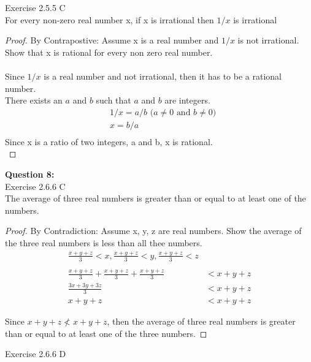 \documentclass[11pt]{article}
\begin{document}
\noindent Exercise 2.5.5 C\\

For every non-zero real number x, if x is irrational then $1/x$ is irrational\\
\begin{proof}
By Contrapostive: Assume x is a real number and $1/x$ is not irrational. Show that x is rational for every non zero real number. \\\\
Since $1/x$ is a real number and not irrational, then it has to be a rational number.\\
There exists an $a$ and $b$ such that $a$ and $b$ are integers.\\
\begin{align*}
&1/x = a/b \text{ ($a \not = 0$ and $b \not = 0$)}\\
&x = b/a\\
\end{align*}
Since x is a ratio of two integers, a and b, x is rational.\\ \qedhere
\end{proof}

\newpage
\noindent \textbf{Question 8:} \\


\noindent Exercise 2.6.6 C\\

\noindent The average of three real numbers is greater than or equal to at least one of the numbers.\\
\begin{proof}
By Contradiction: Assume x, y, z are real numbers. Show the average of the three real numbers is less than all thee numbers.
\begin{align*}
\frac{x + y + z}{3} < x,  \frac{x + y + z}{3} < y, \frac{x+y+z}{3} < z\\
\\
\frac{x+y+z}{3} + \frac{x+y+z}{3} + \frac{x+y+z}{3} &< x + y + z\\
\frac{3x + 3y + 3z}{3} &< x + y + z\\
x + y + z &< x + y + z
\end{align*}

\noindent Since $x + y + z \not < x + y + z$, then the average of three real numbers is greater than or equal to at least one of the three numbers. \qedhere
\end{proof}

\noindent Exercise 2.6.6 D\\
\end{document}
